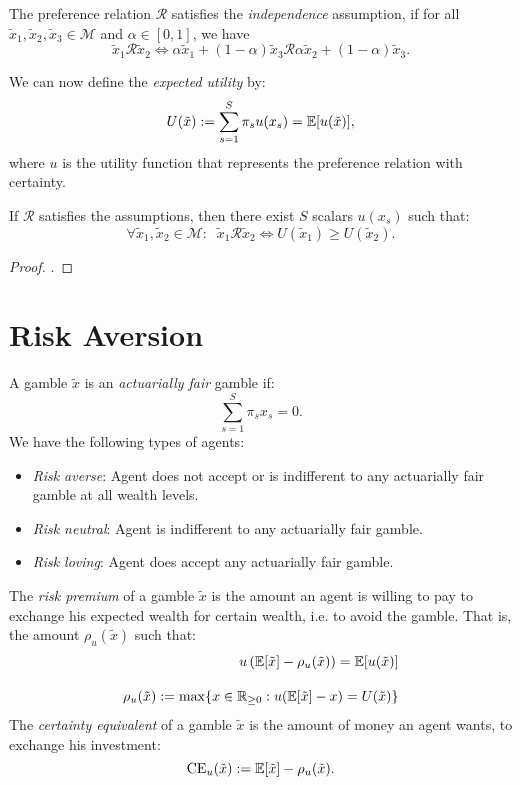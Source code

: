 \documentclass[twoside, titlepage]{article}
\begin{document}
\begin{assumption}[Independence]
    The preference relation $\mathcal{R}$ satisfies the \textit{independence} assumption, if for all $\tilde{x}_1, \tilde{x}_2, \tilde{x}_3 \in \mathcal{M}$ and $\alpha \in [0,1]$, we have
    \[
        \tilde{x}_1 \mathcal{R} \tilde{x}_2 \iff \alpha \tilde{x}_1 + (1 - \alpha)\tilde{x}_3 \mathcal{R} \alpha \tilde{x}_2 + (1 - \alpha)\tilde{x}_3.
    \]
\end{assumption}
We can now define the \textit{expected utility} by:
\[
    U(\tilde{x}) := \sum^S_{s=1}\pi_s u(x_s) = \mathbb{E}[u(\tilde{x})],
\]
where $u$ is the utility function that represents the preference relation with certainty.

\begin{theorem}[Theorem 2.1]
    If $\mathcal{R}$ satisfies the assumptions, then there exist $S$ scalars $u(x_s)$ such that:
    \[
        \forall \tilde{x}_1, \tilde{x}_2 \in \mathcal{M} : \;\; \tilde{x}_1 \mathcal{R} \tilde{x}_2 \iff U(\tilde{x}_1) \geq U(\tilde{x}_2).
    \]
\end{theorem}

\begin{proof}
    .
\end{proof}

\section{Risk Aversion}
A gamble $\tilde{x}$ is an \textit{actuarially fair} gamble if:
\[
    \sum^S_{s=1}\pi_s x_s = 0.
\]
We have the following types of agents:
\begin{itemize}
    \item \textit{Risk averse}: Agent does not accept or is indifferent to any actuarially fair gamble at all wealth levels.
    \item \textit{Risk neutral}: Agent is indifferent to any actuarially fair gamble.
    \item \textit{Risk loving}: Agent does accept any actuarially fair gamble.
\end{itemize}
The \textit{risk premium} of a gamble $\tilde{x}$ is the amount an agent is willing to pay to exchange his expected wealth for certain wealth, i.e. to avoid the gamble. That is, the amount $\rho_u(\tilde{x})$ such that:
\begin{align*}
    u\left(\mathbb{E}[\tilde{x}] - \rho_u(\tilde{x})\right) = \mathbb{E}[u(\tilde{x})] \\[10pt]
    \rho_u(\tilde{x}) := \max \{x \in \mathbb{R}_{\geq0} : u(\mathbb{E}[\tilde{x}] - x) = U(\tilde{x})\}
\end{align*}
The \textit{certainty equivalent} of a gamble $\tilde{x}$ is the amount of money an agent wants, to exchange his investment:
\[
    \text{CE}_u(\tilde{x}) := \mathbb{E}[\tilde{x}] - \rho_u(\tilde{x}).
\]
\end{document}
